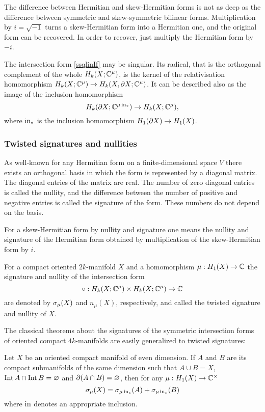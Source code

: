 \documentclass{article}
\numberwithin{equation}{section}
\begin{document}
The difference between Hermitian and skew-Hermitian forms is not as deep
as the difference between symmetric and skew-symmetric bilinear forms.
Multiplication by $i=\sqrt{-1}$ turns a skew-Hermitian form into a
Hermitian one, and the original form can be recovered. In order to
recover, just multiply the Hermitian form by $-i$. 

The intersection form \eqref{ssqlinIf} may be singular. Its radical,
that is the orthogonal complement of the whole $H_k(X;\mathbb C^\mu)$, is the
kernel of the relativisation homomorphism  
$H_k(X;\mathbb C^{\mu})\to H_k(X,\partial X;\mathbb C^\mu)$.  
It can be described also as the image of the inclusion homomorphism 
$$H_k(\partial X;\mathbb C^{\mu\operatorname{in}_*})\to H_k(X;\mathbb C^\mu),$$ where $\operatorname{in}_*$ is the
inclusion homomorphism $H_1(\partial X)\to H_1(X)$.

\subsubsection{Twisted signatures and nullities}\label{sT.4.7} 
As well-known for any Hermitian form on a finite-dimensional space
$V$ there exists an orthogonal basis in which the form is represented by 
a diagonal matrix. The diagonal entries of the matrix are real.
The number of zero diagonal entries is called the {\sfit nullity\/}, 
and the difference between the number of positive and negative
entries is called the {\sfit signature\/} of the form.
These numbers do not depend on the basis.

For a skew-Hermitian form by nullity and signature one means the nullity
and signature of the Hermitian form obtained by multiplication of the
skew-Hermitian form by $i$.

For a compact oriented $2k$-manifold $X$ and a homomorphism $\mu:H_1(X)\to\mathbb C$
the signature and nullity of the intersection form
$$\circ:H_k(X;\mathbb C^\mu)\times H_k(X;\mathbb C^\mu)\to\mathbb C  $$
are denoted by $\sigma_\mu(X)$ and $n_\mu(X)$, respectively, and called the
{\sfit twisted\/} signature and nullity of $X$.

The classical theorems about the signatures of the symmetric intersection 
forms of oriented compact $4k$-manifolds are easily generalized to
twisted signatures:

\begin{ATh}\label{AddOfSign}
Let $X$ be an oriented compact manifold of even dimension.
If $A$ and $B$ are its compact submanifolds of the same dimension
such that $A\cup B=X$, $\operatorname{Int} A\cap\operatorname{Int} B=\varnothing$ and $\partial(A\cap
B)=\varnothing$, then for any $\mu:H_1(X)\to\mathbb C^\times$ 
$$\sigma_\mu(X)=\sigma_{\mu\operatorname{in}_*}(A)+\sigma_{\mu\operatorname{in}_*}(B)$$
where $\operatorname{in}$ denotes an appropriate inclusion.
\end{ATh}
\end{document}

